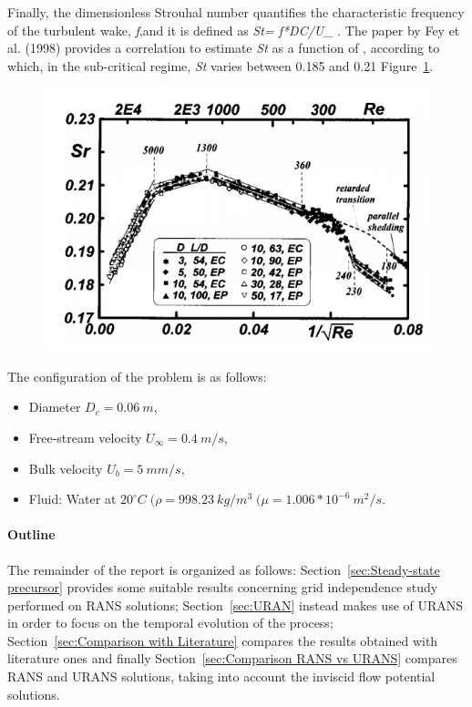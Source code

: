 \documentclass[12pt]{article}
\begin{document}
Finally, the dimensionless Strouhal number quantifies the characteristic frequency of the turbulent wake, \textit{f},and it is defined as \textit{St= f*DC/U_ \infty}. The paper by Fey et al. (1998) provides a correlation to estimate \textit{St} as a function of , according to which, in the sub-critical regime, \textit{St} varies between 0.185 and 0.21 Figure~\ref{fig:strouhal}.


 \begin{figure}[!ht]
                \includegraphics[width=\textwidth]{Strouhal.png}
                \centering
                \caption{}
                \label{fig:strouhal}
        \end{figure}


        The configuration of the problem is as follows:
        \begin{itemize}
                \item Diameter \( D_c = 0.06 \: m \),
                \item Free-stream velocity \( U_\infty = 0.4 \: m/s \),
                \item Bulk velocity \( U_b = 5 \: mm/s \),
                \item Fluid: Water at \( 20^{\circ}C \; ( \rho = 998.23 \: kg/m^3\;( \mu=1.006*10^{-6} \:m^2/s\).
        \end{itemize}


        \paragraph{Outline}
        The remainder of the report is organized as follows: Section~\ref{sec:Steady-state precursor} provides some suitable results concerning grid independence study performed on RANS solutions; Section~\ref{sec:URAN} instead makes use of URANS in order to focus on the temporal evolution  of the process; Section~\ref{sec:Comparison with Literature} compares the results obtained with literature ones and finally  Section~\ref{sec:Comparison RANS vs URANS} compares RANS and URANS solutions, taking into account the inviscid flow potential solutions.
        
\end{document}
